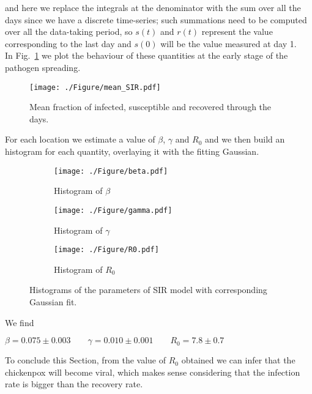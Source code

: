 \documentclass[a4paper,11pt]{article}
\begin{document}
and here we replace the integrals at the denominator with the sum over all the days since we have a discrete time-series; such summations need to be computed over all the data-taking period, so $s(t)$ and $r(t)$ represent the value corresponding to the last day and $s(0)$ will be the value measured at day 1.
\\
In Fig.~\ref{fig:nodedeg} we plot the behaviour of these quantities at the early stage of the pathogen spreading.

\begin{figure}[htp]
\centering
    \texttt{[image: ./Figure/mean\_SIR.pdf]}
    \caption{Mean fraction of infected, susceptible and recovered through the days.}
    \label{fig:nodedeg}
\end{figure}

For each location we estimate a value of $\beta$, $\gamma$ and $R_0$ and we then build an histogram for each quantity, overlaying it with the fitting Gaussian.


\begin{figure}[H]
  \centering
  \begin{subfigure}[t]{.30\textwidth}
    \texttt{[image: ./Figure/beta.pdf]}  
  \caption{Histogram of $\beta$}
  \label{fig:beta_SIR}
  \end{subfigure}%
  \begin{subfigure}[t]{.30\textwidth}
  \texttt{[image: ./Figure/gamma.pdf]}  
  \caption{Histogram of $\gamma$}
  \label{fig:gamma_SIR}
  \end{subfigure}%
  \begin{subfigure}[t]{.30\textwidth}
  \texttt{[image: ./Figure/R0.pdf]}  
  \caption{Histogram of $R_0$}
  \label{fig:R_0SIR}
  \end{subfigure}
  \caption{Histograms of the parameters of SIR model with corresponding Gaussian fit.}
  \label{fig:phase}
\end{figure}

We find 
\begin{center}
   $ \beta=0.075 \pm 0.003 \qquad \gamma=0.010 \pm 0.001 \qquad R_0 = 7.8 \pm 0.7$
\end{center}

To conclude this Section, from the value of $R_0$ obtained we can infer that the chickenpox will become viral, which makes sense considering that the infection rate is bigger than the recovery rate.
\end{document}
